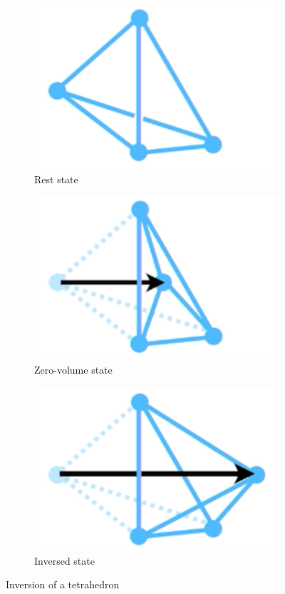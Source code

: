 \begin{figure}[!ht]
\centering
\begin{subfigure}{.3\textwidth}
  \centering
  \includegraphics[width=.8\linewidth]{resources/inversion_1}  
  \caption{Rest state}
  \label{fig:inversion_1}
\end{subfigure}
\begin{subfigure}{.3\textwidth}
  \centering
  \includegraphics[width=.8\linewidth]{resources/inversion_2}  
  \caption{Zero-volume state}
  \label{fig:inversion_2}
\end{subfigure}
\begin{subfigure}{.3\textwidth}
  \centering
  \includegraphics[width=.8\linewidth]{resources/inversion_3}  
  \caption{Inversed state}
  \label{fig:inversion_3}
\end{subfigure}
\caption{Inversion of a tetrahedron {\cite{STREAM2018}}}
\label{fig:inversion}
\end{figure}


